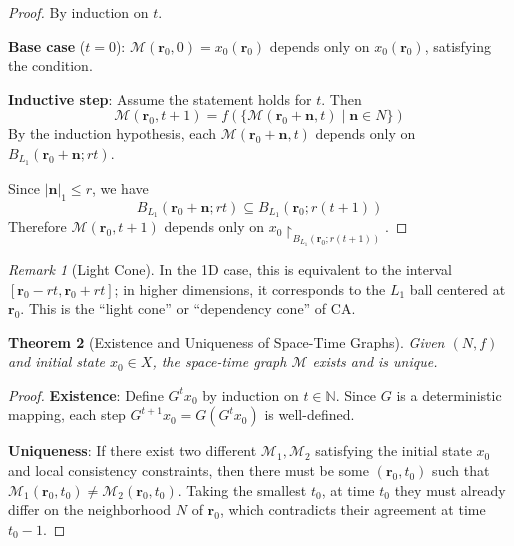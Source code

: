 \documentclass[11pt]{article}
\newtheorem{theorem}{Theorem}[section]
\theoremstyle{definition}
\theoremstyle{remark}
\newtheorem{remark}[theorem]{Remark}
\begin{document}
\begin{proof}
By induction on \( t \).

\textbf{Base case} (\( t=0 \)): \( \mathcal{M}(\mathbf{r}_0, 0) = x_0(\mathbf{r}_0) \) depends only on \( x_0(\mathbf{r}_0) \), satisfying the condition.

\textbf{Inductive step}: Assume the statement holds for \( t \). Then
\[
\mathcal{M}(\mathbf{r}_0, t+1) = f\left( \{ \mathcal{M}(\mathbf{r}_0 + \mathbf{n}, t) \mid \mathbf{n} \in N \} \right)
\]
By the induction hypothesis, each \( \mathcal{M}(\mathbf{r}_0 + \mathbf{n}, t) \) depends only on \( B_{L_1}(\mathbf{r}_0 + \mathbf{n}; rt) \).

Since \( |\mathbf{n}|_1 \le r \), we have
\[
B_{L_1}(\mathbf{r}_0 + \mathbf{n}; rt) \subseteq B_{L_1}(\mathbf{r}_0; r(t+1))
\]
Therefore \( \mathcal{M}(\mathbf{r}_0, t+1) \) depends only on \( x_0 \restriction_{B_{L_1}(\mathbf{r}_0; r(t+1))} \).
\end{proof}

\begin{remark}[Light Cone]
In the 1D case, this is equivalent to the interval \( [\mathbf{r}_0 - rt, \mathbf{r}_0 + rt] \); in higher dimensions, it corresponds to the \( L_1 \) ball centered at \( \mathbf{r}_0 \). This is the ``light cone'' or ``dependency cone'' of CA.
\end{remark}

\begin{theorem}[Existence and Uniqueness of Space-Time Graphs]\label{thm:existence}
Given \( (N, f) \) and initial state \( x_0 \in X \), the space-time graph \( \mathcal{M} \) exists and is unique.
\end{theorem}

\begin{proof}
\textbf{Existence}: Define \( G^t x_0 \) by induction on \( t \in \mathbb{N} \). Since \( G \) is a deterministic mapping, each step \( G^{t+1} x_0 = G(G^t x_0) \) is well-defined.

\textbf{Uniqueness}: If there exist two different \( \mathcal{M}_1, \mathcal{M}_2 \) satisfying the initial state \( x_0 \) and local consistency constraints, then there must be some \( (\mathbf{r}_0, t_0) \) such that \( \mathcal{M}_1(\mathbf{r}_0, t_0) \neq \mathcal{M}_2(\mathbf{r}_0, t_0) \). Taking the smallest \( t_0 \), at time \( t_0 \) they must already differ on the neighborhood \( N \) of \( \mathbf{r}_0 \), which contradicts their agreement at time \( t_0 - 1 \).
\end{proof}
\end{document}
